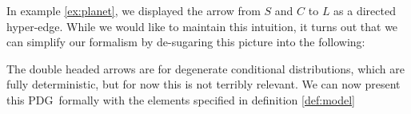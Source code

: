 \documentclass{article}
\newcommand{\MN}{PDG}
\begin{document}
	\begin{example}
		In example \ref{ex:planet}, we displayed the arrow from $S$ and $C$ to $L$ as a directed hyper-edge. While we would like to maintain this intuition, it turns out that we can simplify our formalism by de-sugaring this picture into the following:
		\begin{center}
		\end{center}
		The double headed arrows are for degenerate conditional distributions, which are fully deterministic, but for now this is not terribly relevant. We can now present this \MN\ formally with the elements specified in definition \ref{def:model}
		

\end{example}
\end{document}
